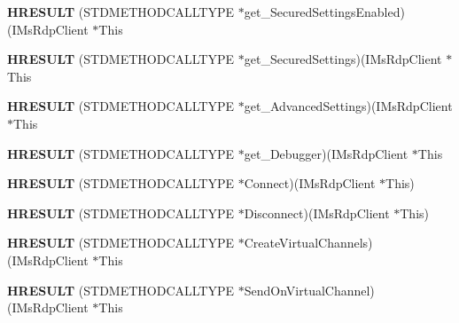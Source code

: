 \begin{DoxyCompactItemize}
{\bfseries H\+R\+E\+S\+U\+LT} (S\+T\+D\+M\+E\+T\+H\+O\+D\+C\+A\+L\+L\+T\+Y\+PE $\ast$get\+\_\+\+Secured\+Settings\+Enabled)(I\+Ms\+Rdp\+Client $\ast$This
\item 
\mbox{\label{struct_i_ms_rdp_client_vtbl_a5c749ce8e1f510f6849813f9dd0edff7}} 
{\bfseries H\+R\+E\+S\+U\+LT} (S\+T\+D\+M\+E\+T\+H\+O\+D\+C\+A\+L\+L\+T\+Y\+PE $\ast$get\+\_\+\+Secured\+Settings)(I\+Ms\+Rdp\+Client $\ast$This
\item 
\mbox{\label{struct_i_ms_rdp_client_vtbl_a6c83f785ebc996b56df94da79694971b}} 
{\bfseries H\+R\+E\+S\+U\+LT} (S\+T\+D\+M\+E\+T\+H\+O\+D\+C\+A\+L\+L\+T\+Y\+PE $\ast$get\+\_\+\+Advanced\+Settings)(I\+Ms\+Rdp\+Client $\ast$This
\item 
\mbox{\label{struct_i_ms_rdp_client_vtbl_ae0e5ce200e31bed37ccc568b46a37b6e}} 
{\bfseries H\+R\+E\+S\+U\+LT} (S\+T\+D\+M\+E\+T\+H\+O\+D\+C\+A\+L\+L\+T\+Y\+PE $\ast$get\+\_\+\+Debugger)(I\+Ms\+Rdp\+Client $\ast$This
\item 
\mbox{\label{struct_i_ms_rdp_client_vtbl_a94dcdb297be2f24bad0e4f9cf2f820a7}} 
{\bfseries H\+R\+E\+S\+U\+LT} (S\+T\+D\+M\+E\+T\+H\+O\+D\+C\+A\+L\+L\+T\+Y\+PE $\ast$Connect)(I\+Ms\+Rdp\+Client $\ast$This)
\item 
\mbox{\label{struct_i_ms_rdp_client_vtbl_aaab218691d2609c5e907ddc4766feb06}} 
{\bfseries H\+R\+E\+S\+U\+LT} (S\+T\+D\+M\+E\+T\+H\+O\+D\+C\+A\+L\+L\+T\+Y\+PE $\ast$Disconnect)(I\+Ms\+Rdp\+Client $\ast$This)
\item 
\mbox{\label{struct_i_ms_rdp_client_vtbl_a25f22c9f4331774abbb38ea12f454fbb}} 
{\bfseries H\+R\+E\+S\+U\+LT} (S\+T\+D\+M\+E\+T\+H\+O\+D\+C\+A\+L\+L\+T\+Y\+PE $\ast$Create\+Virtual\+Channels)(I\+Ms\+Rdp\+Client $\ast$This
\item 
\mbox{\label{struct_i_ms_rdp_client_vtbl_a60111c623f1c1edcb46e0cb9c12f4811}} 
{\bfseries H\+R\+E\+S\+U\+LT} (S\+T\+D\+M\+E\+T\+H\+O\+D\+C\+A\+L\+L\+T\+Y\+PE $\ast$Send\+On\+Virtual\+Channel)(I\+Ms\+Rdp\+Client $\ast$This
\item 
\mbox{\label{struct_i_ms_rdp_client_vtbl_aed1b237a9505fb5d2064362199ae16c3}} 

\end{DoxyCompactItemize}

